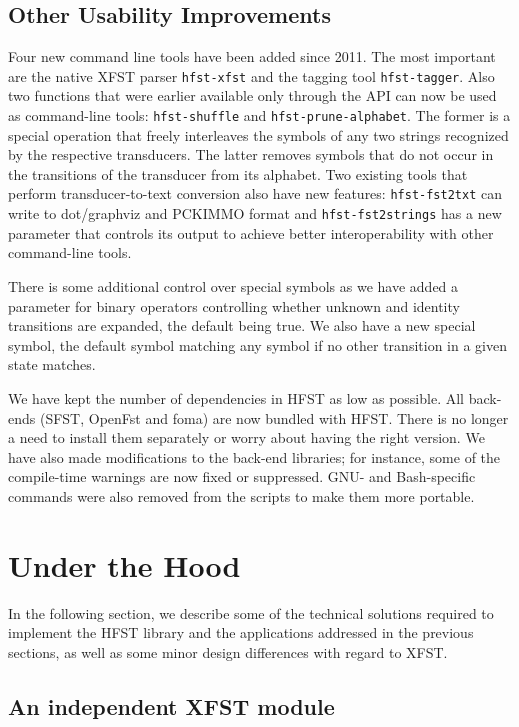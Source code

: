 \documentclass{llncs}
\begin{document}
\subsection{Other Usability Improvements}

Four new command line tools have been added since 2011. The most important are the native XFST
parser \texttt{hfst-xfst} and the tagging tool \texttt{hfst-tagger}. Also two functions
that were earlier available only through the API can now be used as
command-line tools: \texttt{hfst-shuffle} and \texttt{hfst-prune-alphabet}. The former is a special operation 
that freely interleaves the symbols of any two strings recognized by
the respective transducers.    
The latter removes symbols that do not occur in the transitions of the transducer from its alphabet. 
Two existing tools that perform transducer-to-text conversion also have new features: 
\texttt{hfst-fst2txt} can write to dot/graphviz
and PCKIMMO format and \texttt{hfst-fst2strings} has a new parameter that
controls its output to achieve better interoperability with other
command-line tools.

There is some additional control over special symbols as we have added a parameter
for binary operators controlling whether unknown and identity transitions
are expanded, the default being true. We also have a new special
symbol, the default symbol matching any symbol if no other
transition in a given state matches.

We have kept the number of dependencies in HFST as low as possible.
All back-ends (SFST, OpenFst and foma) are now bundled with
HFST. There is no longer a need to install them separately or worry about
having the right version. We have also made modifications to the
back-end libraries; for instance, some of the compile-time warnings are now fixed or
suppressed. GNU- and Bash-specific commands were also removed from
the scripts to make them more portable.

\section{Under the Hood}\label{hfst:solutions}

In the following section, we describe some of the technical solutions required to implement the HFST library and the applications addressed in the previous sections, as well as some minor design differences with regard to XFST.

\subsection{An independent XFST module}
\end{document}
